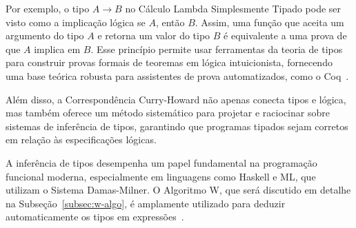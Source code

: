 Por exemplo, o tipo $A \to B$ no Cálculo Lambda Simplesmente Tipado pode ser visto como a implicação lógica se $A$, então $B$.
Assim, uma função que aceita um argumento do tipo $A$ e retorna um valor do tipo $B$ é equivalente a uma prova de que $A$ implica em $B$.
Esse princípio permite usar ferramentas da teoria de tipos para construir provas formais de teoremas em lógica intuicionista, fornecendo uma base teórica robusta para assistentes de prova automatizados, como o Coq~\cite{COQUAND1998}.

Além disso, a Correspondência Curry-Howard não apenas conecta tipos e lógica, mas também oferece um método sistemático para projetar e raciocinar sobre sistemas de inferência de tipos, garantindo que programas tipados sejam corretos em relação às especificações lógicas.

A inferência de tipos desempenha um papel fundamental na programação funcional moderna, especialmente em linguagens como Haskell e ML, que utilizam o Sistema Damas-Milner.
O Algoritmo W, que será discutido em detalhe na Subseção~\ref{subsec:w-algo}, é amplamente utilizado para deduzir automaticamente os tipos em expressões~\cite{PIERCE2002}.
